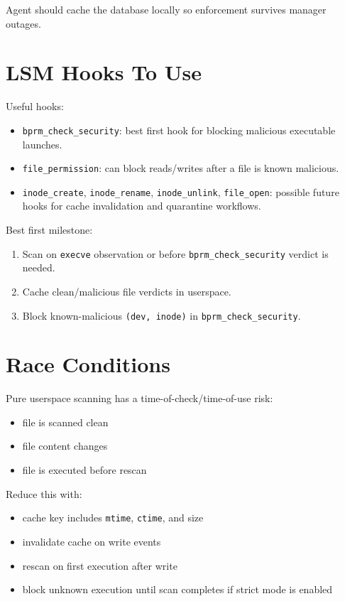 \documentclass[
  12pt,
]{report}
\providecommand{\tightlist}{%
  \setlength{\itemsep}{0pt}\setlength{\parskip}{0pt}}
\begin{document}
Agent should cache the database locally so enforcement survives manager
outages.

\section{LSM Hooks To Use}\label{lsm-hooks-to-use}

Useful hooks:

\begin{itemize}
\tightlist
\item
  \texttt{bprm\_check\_security}: best first hook for blocking malicious
  executable launches.
\item
  \texttt{file\_permission}: can block reads/writes after a file is
  known malicious.
\item
  \texttt{inode\_create}, \texttt{inode\_rename},
  \texttt{inode\_unlink}, \texttt{file\_open}: possible future hooks for
  cache invalidation and quarantine workflows.
\end{itemize}

Best first milestone:

\begin{enumerate}
\def\labelenumi{\arabic{enumi}.}
\tightlist
\item
  Scan on \texttt{execve} observation or before
  \texttt{bprm\_check\_security} verdict is needed.
\item
  Cache clean/malicious file verdicts in userspace.
\item
  Block known-malicious \texttt{(dev,\ inode)} in
  \texttt{bprm\_check\_security}.
\end{enumerate}

\section{Race Conditions}\label{race-conditions}

Pure userspace scanning has a time-of-check/time-of-use risk:

\begin{itemize}
\tightlist
\item
  file is scanned clean
\item
  file content changes
\item
  file is executed before rescan
\end{itemize}

Reduce this with:

\begin{itemize}
\tightlist
\item
  cache key includes \texttt{mtime}, \texttt{ctime}, and size
\item
  invalidate cache on write events
\item
  rescan on first execution after write
\item
  block unknown execution until scan completes if strict mode is enabled
\end{itemize}
\end{document}
